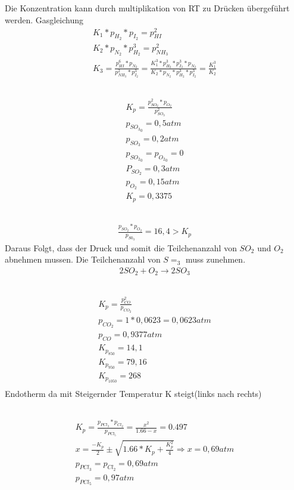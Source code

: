 \documentclass[a4paper]{article}
\begin{document}
\subsection{}
Die Konzentration kann durch multiplikation von RT zu Drücken übergeführt werden. Gasgleichung
\begin{align}
  K_1*p_{H_2}*p_{I_2}=p_{HI}^2 \\
  K_2*p_{N_2}*p_{H_2}^3=p_{NH_3}^2\\
  K_3=\frac{p_{HI}^6*p_{N_2}}{p_{NH_3}^2*p_{I_2}^3}=
  \frac{K_1^3*p_{H_2}^3*p_{I_2}^3*p_{N_2}}{K_2*p_{N_2}*p_{H_2}^3*p_{I_2}^3}=  \frac{K_1^3}{K_2}
\end{align}

\subsection{}
\begin{align}
  K_p=\frac{p_{SO_2}^2*p_{O_2}}{p_{SO_3}^2}\\
  p_{{SO_3}_0}=0,5 atm\\
  p_{SO_3}=0,2 atm\\
  p_{{SO_2}_0}=p_{{O_2}_0}=0\\
  P_{SO_2}=0,3 atm\\
  p_{O_2}=0,15 atm\\
  K_p = 0,3375
\end{align}

\subsection{}
\begin{align}
  \frac{p_{SO_2}*p_{O_2}}{p_{S0_3}}=16,4 > K_p
\end{align}
Daraus Folgt, dass der Druck und somit die Teilchenanzahl von $SO_2$ und $O_2$ abnehmen mussen. Die Teilchenanzahl von $S=_3$ muss zunehmen.
\begin{align}
  2SO_2 + O_2 \rightarrow 2SO_3
\end{align}

\subsection{}
\begin{align}
  K_p = \frac{p_{CO}^2}{p_{CO_2}}\\
  p_{CO_2}=1*0,0623=0,0623 atm\\
  p_{CO}=0,9377 atm\\
  K_{p_{850}}=14,1\\
  K_{p_{950}}=79,16\\
  K_{p_{1050}}=268\\ 
\end{align}
Endotherm da mit Steigernder Temperatur K steigt(links nach rechts)

\subsection{}
\begin{align}
  K_p = \frac{p_{PCl_3}*p_{Cl_2}}{p_{PCl_5}}=\frac{x^2}{1.66-x}=0.497\\
  x=\frac{-K_p}{2} \pm \sqrt{1.66*K_p+\frac{K_p^2}{4}} \Rightarrow x=0,69 atm\\
  p_{PCl_3} = p_{Cl_2}=0,69 atm\\
  p_{PCl_5} = 0,97 atm
\end{align}
\end{document}
